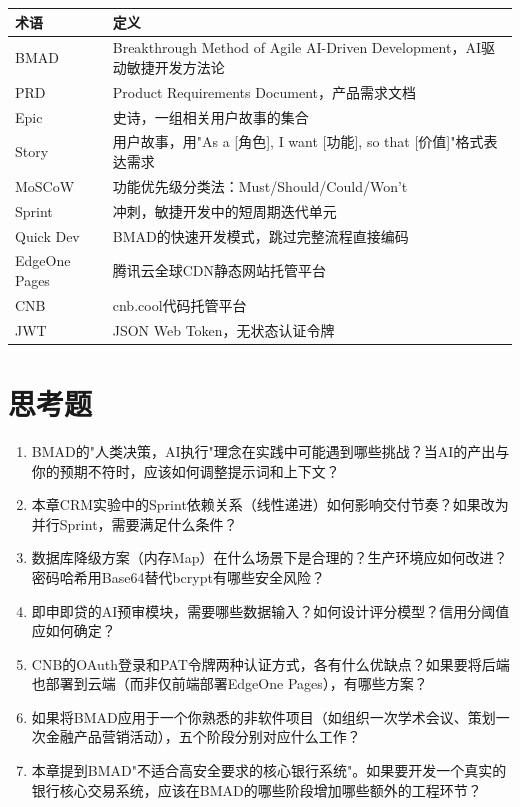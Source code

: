 \begin{table}[H]
\centering
\small
\begin{tabular}{lp{9cm}}
\toprule
\textbf{术语} & \textbf{定义} \\
\midrule
BMAD & Breakthrough Method of Agile AI-Driven Development，AI驱动敏捷开发方法论 \\
PRD & Product Requirements Document，产品需求文档 \\
Epic & 史诗，一组相关用户故事的集合 \\
Story & 用户故事，用"As a [角色], I want [功能], so that [价值]"格式表达需求 \\
MoSCoW & 功能优先级分类法：Must/Should/Could/Won't \\
Sprint & 冲刺，敏捷开发中的短周期迭代单元 \\
Quick Dev & BMAD的快速开发模式，跳过完整流程直接编码 \\
EdgeOne Pages & 腾讯云全球CDN静态网站托管平台 \\
CNB & cnb.cool代码托管平台 \\
JWT & JSON Web Token，无状态认证令牌 \\
\bottomrule
\end{tabular}
\end{table}

\section{思考题}

\begin{exercisebox}[思考与讨论]
\begin{enumerate}[leftmargin=2em]
  \item BMAD的"人类决策，AI执行"理念在实践中可能遇到哪些挑战？当AI的产出与你的预期不符时，应该如何调整提示词和上下文？

  \item 本章CRM实验中的Sprint依赖关系（线性递进）如何影响交付节奏？如果改为并行Sprint，需要满足什么条件？

  \item 数据库降级方案（内存Map）在什么场景下是合理的？生产环境应如何改进？密码哈希用Base64替代bcrypt有哪些安全风险？

  \item 即申即贷的AI预审模块，需要哪些数据输入？如何设计评分模型？信用分阈值应如何确定？

  \item CNB的OAuth登录和PAT令牌两种认证方式，各有什么优缺点？如果要将后端也部署到云端（而非仅前端部署EdgeOne Pages），有哪些方案？

  \item 如果将BMAD应用于一个你熟悉的非软件项目（如组织一次学术会议、策划一次金融产品营销活动），五个阶段分别对应什么工作？

  \item 本章提到BMAD"不适合高安全要求的核心银行系统"。如果要开发一个真实的银行核心交易系统，应该在BMAD的哪些阶段增加哪些额外的工程环节？
\end{enumerate}
\end{exercisebox}

